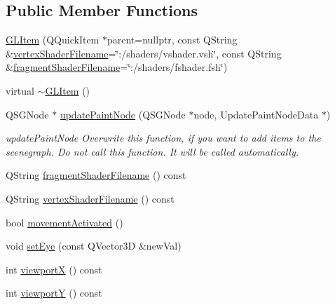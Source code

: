 \subsection*{Public Member Functions}
\begin{DoxyCompactItemize}
\item 
\mbox{\hyperlink{class_g_l_item_aae26b9d7f00f845229e3e0dfaec07392}{G\+L\+Item}} (Q\+Quick\+Item $\ast$parent=nullptr, const Q\+String \&\mbox{\hyperlink{class_g_l_item_aa18b199e7c5d8a1c0a288dc45b12c8c6}{vertex\+Shader\+Filename}}=\char`\"{}\+:/shaders/vshader.\+vsh\char`\"{}, const Q\+String \&\mbox{\hyperlink{class_g_l_item_a81e33a49ac37afcc322c703b55cd6071}{fragment\+Shader\+Filename}}=\char`\"{}\+:/shaders/fshader.\+fsh\char`\"{})
\item 
virtual \mbox{\hyperlink{class_g_l_item_a7957569811963cb1f0cc6639262e506d}{$\sim$\+G\+L\+Item}} ()
\item 
Q\+S\+G\+Node $\ast$ \mbox{\hyperlink{class_g_l_item_a3ee5b8ed5321e4b60d233328e3b89d3a}{update\+Paint\+Node}} (Q\+S\+G\+Node $\ast$node, Update\+Paint\+Node\+Data $\ast$)
\begin{DoxyCompactList}\small\item\em update\+Paint\+Node Overwrite this function, if you want to add items to the scenegraph. Do not call this function. It will be called automatically. \end{DoxyCompactList}\item 
Q\+String \mbox{\hyperlink{class_g_l_item_a8b2e0c9769ceddce3e79959cce359236}{fragment\+Shader\+Filename}} () const
\item 
Q\+String \mbox{\hyperlink{class_g_l_item_ac329bb38182a8921e8f83f6990366648}{vertex\+Shader\+Filename}} () const
\item 
bool \mbox{\hyperlink{class_g_l_item_a45485508d639ce1c0855928c59bdf7db}{movement\+Activated}} ()
\item 
void \mbox{\hyperlink{class_g_l_item_a9a731cdacee49b522f6da9f7439048dd}{set\+Eye}} (const Q\+Vector3D \&new\+Val)
\item 
int \mbox{\hyperlink{class_g_l_item_ad9b8583ed12cdc4eadb5a23e3a9c0791}{viewportX}} () const
\item 
int \mbox{\hyperlink{class_g_l_item_a890604fe40a634ca721a55494e69079a}{viewportY}} () const
\end{DoxyCompactItemize}
